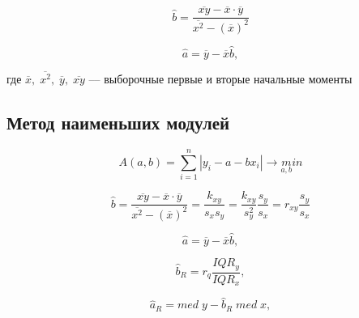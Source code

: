 \documentclass[12pt]{article}
\begin{document}
\begin{equation}
    \label{coeff_6:1}
    \hat b = \frac{\overline{xy} - \overline{x} \cdot \overline {y}}{\overline{x^2} - (\overline{x})^2}
\end{equation}

\begin{equation}
    \label{coeff_6:2}
    \hat a = \overline{y} - \overline{x} \hat b,
\end{equation}

где $\overline{x}, \; \overline{x^2}, \; \overline{y}, \; \overline{xy}$ –– выборочные первые и вторые начальные моменты

\subsection*{Метод наименьших модулей}

\begin{equation}
    \label{crit_6:2}
    A(a, b) = \sum_{i=1}^{n}{|y_i - a - bx_i|} \rightarrow \underset{a, b} min
\end{equation}


\begin{equation}
    \label{coeff_6:3}
    \hat b = \frac{\overline{xy} - \overline{x} \cdot \overline {y}}{\overline{x^2} - (\overline{x})^2} = \frac{k_{xy}}{s_xs_y} = \frac{k_{xy}}{s^2_y} \frac{s_y}{s_x} = r_{xy} \frac{s_y}{s_x}
\end{equation}

\begin{equation}
    \label{coeff_6:4}
    \hat a = \overline{y} - \overline{x} \hat b,
\end{equation}


\begin{equation}
    \label{coeff_6:5}
    \hat b_R = r_q \frac{IQR_y}{IQR_x},
\end{equation}

\begin{equation}
    \label{coeff_6:6}
    \hat a_R = med \; y - \hat b_R \; med \; x,
\end{equation}
\end{document}
